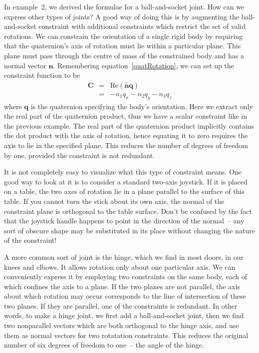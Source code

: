 In example~2, we derived the formulae for a ball-and-socket joint. How can we express other types
of joints? A good way of doing this is by augmenting the ball-and-socket constraint with
additional constraints which restrict the set of valid rotations. We can constrain the orientation
of a single rigid body by requiring that the quaternion's axis of rotation must lie within a
particular plane. This plane must pass through the centre of mass of the constrained body and
has a normal vector $\mathbf{n}$. Remembering equation~\ref{quatRotation}, we can set up the
constraint function to be
\begin{eqnarray}
\label{constrEx4C}
\mathbf{C} & = & \mathrm{Re}(\tilde{\mathbf{n}}\mathbf{q}) \\
& = & - n_1 q_x - n_2 q_y - n_3 q_z \nonumber
\end{eqnarray}
where $\mathbf{q}$ is the quaternion specifying the body's orientation. Here we extract only the
real part of the quaternion product, thus we have a scalar constraint like in the previous
example. The real part of the quaternion product implicitly contains the dot product with the
axis of rotation, hence equating it to zero requires the axis to lie in the specified plane.
This reduces the number of degrees of freedom by one, provided the constraint is not redundant.

It is not completely easy to visualize what this type of constraint means. One good way to look
at it is to consider a standard two-axis joystick. If it is placed on a table, the two axes of
rotation lie in a plane parallel to the surface of this table. If you cannot turn the stick about
its own axis, the normal of the constraint plane is orthogonal to the table surface.
Don't be confused by the fact that the joystick handle happens to point in the direction of the
normal~-- any sort of obscure shape may be substituted in its place without changing the nature
of the constraint!

A more common sort of joint is the hinge, which we find in most doors, in our knees and elbows.
It allows rotation only about one particular axis. We can conveniently express it by employing two
constraints on the same body, each of which confines the axis to a plane. If the two planes are
not parallel, the axis about which rotation may occur corresponds to the line of intersection of
these two planes. If they are parallel, one of the constraints is redundant. In other words,
to make a hinge joint, we first add a ball-and-socket joint, then we find two nonparallel vectors
which are both orthogonal to the hinge axis, and use them as normal vectors for two rotatation
constraints. This reduces the original number of six degrees of freedom to one~-- the angle of the
hinge.

